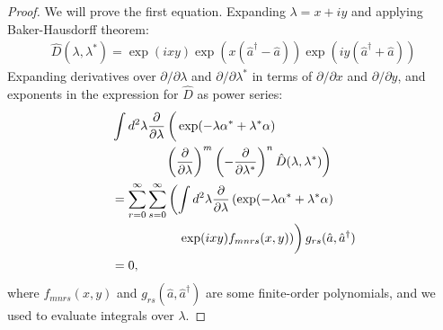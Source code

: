 \begin{proof}
We will prove the first equation.
Expanding $\lambda = x + iy$ and applying Baker-Hausdorff theorem:
\begin{equation}
\begin{split}
	\hat{D}(\lambda, \lambda^*)
	= \exp(ixy) \exp(x(\hat{a}^\dagger - \hat{a})) \exp(iy(\hat{a}^\dagger + \hat{a}))
\end{split}
\end{equation}
Expanding derivatives over $\partial/\partial\lambda$ and $\partial/\partial\lambda^*$ in terms of $\partial/\partial x$ and $\partial/\partial y$, and exponents in the expression for $\hat{D}$ as power series:
\begin{equation}
\begin{split}
	& \int d^2\lambda
		\frac{\partial}{\partial \lambda} \left(
			\vphantom{\left( \frac{\partial}{\partial \lambda} \right)^m} %
			\exp(-\lambda \alpha^* + \lambda^* \alpha)
		\right. \\
	& \hphantom{\int d^2\lambda \frac{\partial}{\partial \lambda}} %
		\left.
			\left( \frac{\partial}{\partial \lambda} \right)^m
			\left( -\frac{\partial}{\partial \lambda^*} \right)^n
			\hat{D}(\lambda, \lambda^*)
		\right) \\
	& = \sum_{r=0}^{\infty} \sum_{s=0}^{\infty} \left(
			\int d^2\lambda
			\frac{\partial}{\partial \lambda} \left(
				\exp(-\lambda \alpha^* + \lambda^* \alpha)
			\right.
		\right. \\
	& \hphantom{sum_{r=0}^{\infty} \sum_{s=0}^{\infty}} %
		\left.
			\vphantom{\int d^2\lambda} %
	 		\left.
				\exp(ixy) f_{mnrs}(x, y)
			\right)
		\right)
		g_{rs}(\hat{a}, \hat{a}^\dagger) \\
	& = 0,
\end{split}
\end{equation}
where $f_{mnrs}(x, y)$ and $g_{rs}(\hat{a}, \hat{a}^\dagger)$ are some finite-order polynomials,
and we used  to evaluate integrals over $\lambda$.
\end{proof}

